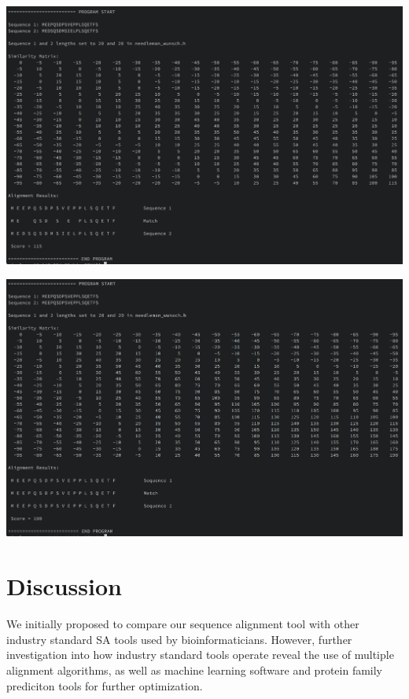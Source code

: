 \documentclass{article}
\begin{document}
\begin{center}
    \includegraphics[scale=0.35]{human_rat}
    \label{fig:human_rat}

    \includegraphics[scale=0.35]{human_human}
    \label{fig:human_human}
\end{center}


\section*{Discussion}
We initially proposed to compare our sequence alignment tool with other
industry standard SA tools used by bioinformaticians. 
However, further investigation into how industry standard tools operate reveal the
use of multiple alignment algorithms, as well as machine learning software and
protein family prediciton tools for further optimization.
\end{document}
